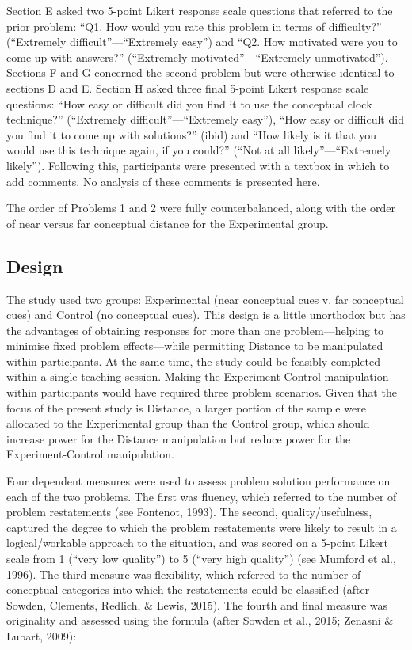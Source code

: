 \documentclass[english,man]{apa6}
\begin{document}
Section E asked two 5-point Likert response scale questions that
referred to the prior problem: \enquote{Q1. How would you rate this
problem in terms of difficulty?} (\enquote{Extremely
difficult}---\enquote{Extremely easy}) and \enquote{Q2. How motivated
were you to come up with answers?} (\enquote{Extremely
motivated}---\enquote{Extremely unmotivated}). Sections F and G
concerned the second problem but were otherwise identical to sections D
and E. Section H asked three final 5-point Likert response scale
questions: \enquote{How easy or difficult did you find it to use the
conceptual clock technique?} (\enquote{Extremely
difficult}---\enquote{Extremely easy}), \enquote{How easy or difficult
did you find it to come up with solutions?} (ibid) and \enquote{How
likely is it that you would use this technique again, if you could?}
(\enquote{Not at all likely}---\enquote{Extremely likely}). Following
this, participants were presented with a textbox in which to add
comments. No analysis of these comments is presented here.

The order of Problems 1 and 2 were fully counterbalanced, along with the
order of near versus far conceptual distance for the Experimental group.

\hypertarget{design}{%
\subsection{Design}\label{design}}

The study used two groups: Experimental (near conceptual cues v. far
conceptual cues) and Control (no conceptual cues). This design is a
little unorthodox but has the advantages of obtaining responses for more
than one problem---helping to minimise fixed problem effects---while
permitting Distance to be manipulated within participants. At the same
time, the study could be feasibly completed within a single teaching
session. Making the Experiment-Control manipulation within participants
would have required three problem scenarios. Given that the focus of the
present study is Distance, a larger portion of the sample were allocated
to the Experimental group than the Control group, which should increase
power for the Distance manipulation but reduce power for the
Experiment-Control manipulation.

Four dependent measures were used to assess problem solution performance
on each of the two problems. The first was fluency, which referred to
the number of problem restatements (see Fontenot, 1993). The second,
quality/usefulness, captured the degree to which the problem
restatements were likely to result in a logical/workable approach to the
situation, and was scored on a 5-point Likert scale from 1
(\enquote{very low quality}) to 5 (\enquote{very high quality}) (see
Mumford et al., 1996). The third measure was flexibility, which referred
to the number of conceptual categories into which the restatements could
be classified (after Sowden, Clements, Redlich, \& Lewis, 2015). The
fourth and final measure was originality and assessed using the formula
(after Sowden et al., 2015; Zenasni \& Lubart, 2009):
\end{document}
